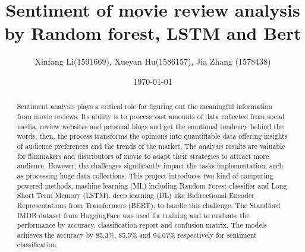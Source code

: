 \documentclass[11pt]{article}
\begin{document}
\title{
Sentiment of movie review analysis by Random forest, LSTM and Bert
}

\author{
  Xinfang Li(1591669), Xueyan Hu(1586157), Jia Zhang (1578438)
}
\date{\today}

\maketitle
\markboth{}{}

\begin{abstract}
Sentiment analysis plays a critical role for figuring out the meaningful information from movie reviews. Its ability is to process vast amounts of data collected from social media, review websites and personal blogs and get the emotional tendency behind the words, then, the process transforms the opinions into quantifiable data offering insights of audience preferences and the trends of the market. The analysis results are valuable for filmmakers and distributors of movie to adapt their strategies to attract more audience. However, the challenges significantly impact the tasks implementation, such as processing huge data collections. This project introduces two kind of computing powered methods, machine learning (ML) including Random Forest classifier and Long Short Term Memory (LSTM), deep learning (DL) like Bidirectional Encoder Representations from Transformers (BERT), to handle this challenge. The Standford IMDB dataset from HuggingFace was used for training and to evaluate the performance by accuracy, classification report and confusion matrix. The models achieves the accuracy by 85.3\%, 85.5\% and 94.07\% respectively for sentiment classification.
\end{abstract}

\clearpage
\thispagestyle{empty}
\tableofcontents
\thispagestyle{empty}

\clearpage
\setcounter{page}{1}









\clearpage


\end{document}
